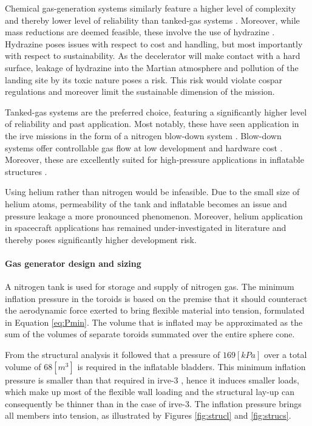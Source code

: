 Chemical gas-generation systems similarly feature a higher level of complexity and thereby lower level of reliability than tanked-gas systems \cite{Jenkins2001}. Moreover, while mass reductions are deemed feasible, these involve the use of hydrazine \cite{Jenkins2001, Freeland1998}. Hydrazine poses issues with respect to cost and handling, but most importantly with respect to sustainability. As the decelerator will make contact with a hard surface, leakage of hydrazine into the Martian atmosphere and pollution of the landing site by its toxic nature poses a risk. This risk would violate \gls{cospar} regulations and moreover limit the sustainable dimension of the mission.

Tanked-gas systems are the preferred choice, featuring a significantly higher level of reliability and past application. Most notably, these have seen application in the \gls{irve} missions in the form of a nitrogen blow-down system \cite{Smith2010}. Blow-down systems offer controllable gas flow at low development and hardware cost \cite{Freeland1998}. Moreover, these are excellently suited for high-pressure applications in inflatable structures \cite{Jenkins2001}.

Using helium rather than nitrogen would be infeasible. Due to the small size of helium atoms, permeability of the tank and inflatable becomes an issue and pressure leakage a more pronounced phenomenon. Moreover, helium application in spacecraft applications has remained under-investigated in literature and thereby poses significantly higher development risk.


\paragraph{Gas generator design and sizing}
A nitrogen tank is used for storage and supply of nitrogen gas. The minimum inflation pressure in the toroids is based on the premise that it should counteract the aerodynamic force exerted to bring flexible material into tension, formulated in Equation \ref{eq:Pmin}. The volume that is inflated may be approximated as the sum of the volumes of separate toroids summated over the entire sphere cone.

From the structural analysis it followed that a pressure of $169 \left[kPa\right]$ over a total volume of $68 \left[m^{3}\right]$ is required in the inflatable bladders. This minimum inflation pressure is smaller than that required in \gls{irve}-3 \cite{Jurewicz2011}, hence it induces smaller loads, which make up most of the flexible wall loading and the structural lay-up can consequently be thinner than in the case of \gls{irve}-3. The inflation pressure brings all members into tension, as illustrated by Figures \ref{fig:strucl} and \ref{fig:strucs}.

